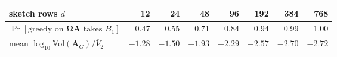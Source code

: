 \begin{tabular}{@{}lrrrrrrr@{}}
\toprule
sketch rows $d$ & 12 & 24 & 48 & 96 & 192 & 384 & 768\\
\midrule
$\Pr[\text{greedy on }\boldsymbol\Omega\mathbf A\text{ takes }B_1]$ & 0.47 & 0.55 & 0.71 & 0.84 & 0.94 & 0.99 & 1.00\\
mean $\log_{10}\mathbb{V}\mathrm{ol}(\mathbf A_{G})/\overline V_2$ & $-1.28$ & $-1.50$ & $-1.93$ & $-2.29$ & $-2.57$ & $-2.70$ & $-2.72$\\
\bottomrule
\end{tabular}
